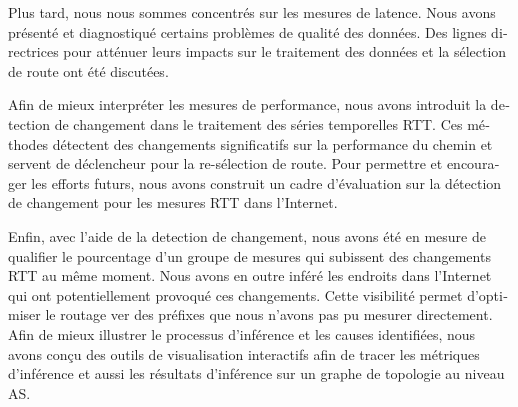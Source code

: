 \begin{otherlanguage}{french}
Plus tard, nous nous sommes concentrés sur les mesures de latence.
Nous avons présenté et diagnostiqué certains problèmes de qualité des données.
Des lignes directrices pour atténuer leurs impacts sur le traitement des données et la sélection de route ont été discutées.

Afin de mieux interpréter les mesures de performance, 
nous avons introduit la detection de changement dans le traitement des séries temporelles RTT.
Ces méthodes détectent des changements significatifs sur la performance du chemin et 
servent de déclencheur pour la re-sélection de route.
Pour permettre et encourager les efforts futurs, nous avons construit un cadre d'évaluation 
sur la détection de changement pour les mesures RTT dans l'Internet.

Enfin, avec l'aide de la detection de changement, nous avons été en mesure de qualifier 
le pourcentage d'un groupe de mesures qui subissent des changements RTT au même moment.
Nous avons en outre inféré les endroits dans l'Internet qui ont potentiellement provoqué ces changements.
Cette visibilité permet d'optimiser le routage ver des préfixes que nous n'avons pas pu mesurer directement.
Afin de mieux illustrer le processus d'inférence et les causes identifiées, 
nous avons conçu des outils de visualisation interactifs afin de tracer les métriques d'inférence et 
aussi les résultats d'inférence sur un graphe de topologie au niveau AS.

\vfill

\end{otherlanguage}
\endgroup			

